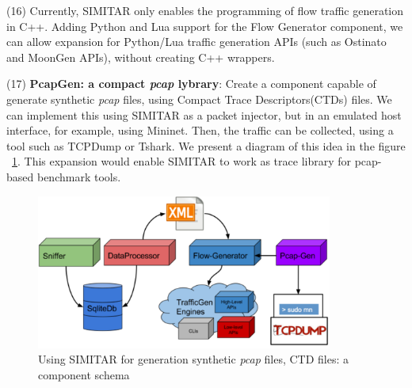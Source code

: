 (16) Currently, SIMITAR only enables the programming of flow traffic generation in C++. Adding Python and Lua support for the Flow Generator component, we can allow expansion for Python/Lua traffic generation APIs (such as Ostinato and MoonGen APIs), without creating C++ wrappers.


(17) \textbf{PcapGen: a compact \textit{pcap} lybrary}: Create a component capable of generate synthetic \textit{pcap} files, using Compact Trace Descriptors(CTDs) files. We can implement this using SIMITAR as a packet injector, but in an emulated host interface, for example, using Mininet. Then, the traffic can be collected, using a tool such as TCPDump or Tshark. We present a diagram of this idea in the figure ~\ref{fig:pcap-gen}. This expansion would enable SIMITAR  to work as trace library for pcap-based benchmark tools.


\begin{figure}[!ht]
    \centering
    \includegraphics[height=2.0in]{figures/ch6/pcap-gen}
    \caption{Using SIMITAR for generation synthetic \textit{pcap} files, CTD files: a component schema}
    \label{fig:pcap-gen}
\end{figure}
    




